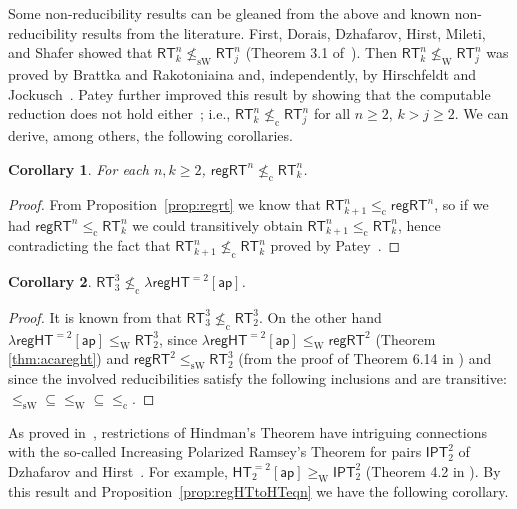 \documentclass[a4paper,11pt]{article}
\newtheorem{corollary}{Corollary}
\newcommand\HT{\mathsf{HT}}
\newcommand\IPT{\mathsf{IPT}}
\newcommand\RT{\mathsf{RT}}
\newcommand\regHT{\mathsf{regHT}}
\newcommand\REG{\mathsf{regRT}}
\newcommand\compred{\mathrm{c}}
\newcommand\W{\mathrm{W}}
\newcommand\sW{\mathrm{sW}}
\newcommand\ap{\mathsf{ap}}
\begin{document}
Some non-reducibility results can be gleaned from the above and known non-reducibility results from the literature. First, Dorais, Dzhafarov, Hirst, Mileti, and Shafer showed that $\RT^n_k \not\leq_{\sW} \RT^n_j$ (Theorem 3.1 of~\cite{DJSW:16}). Then $\RT^n_k \not\leq_{\W} \RT^n_j$ was proved by Brattka and Rakotoniaina \cite{Bra-Rat:17} and, independently, by Hirschfeldt and Jockusch~\cite{Hir-Joc:16}. Patey further improved this result by showing that the computable reduction does not hold either~\cite{Pat:16}; i.e., $\RT^n_k \not\leq_{\compred} \RT^n_j$ for all $n\geq 2$, $k > j \geq 2$. We can derive, among others, the following corollaries. 

\begin{corollary}\label{prop:reg-forallk-rt}
For each $n, k \geq 2$, $\REG^n \not\leq_{\compred} \RT^n_k$.
\end{corollary}

\begin{proof}
From Proposition~\ref{prop:regrt} we know that $\RT^n_{k+1} \leq_{\compred} \REG^n$, so if we had $\REG^n \leq_{\compred} \RT^n_k$ we could transitively obtain $\RT^n_{k+1} \leq_{\compred} \RT^n_k$, hence contradicting the fact that $\RT^n_{k+1} \not\leq_{\compred} \RT^n_k$ proved by Patey~\cite{Pat:16}.
\end{proof}

\begin{corollary}
$\RT^3_3\not\leq_{\compred}\lambda\regHT^{= 2}[\ap]$.
\end{corollary}

\begin{proof}
It is known from \cite{Pat:16} that $\RT^3_3 \not\leq_{\compred} \RT^3_2$. 
On the other hand $\lambda\regHT^{= 2}[\ap] \leq_{\mathrm{W}} \RT^3_2$, since
$\lambda\regHT^{= 2}[\ap] \leq_{\mathrm{W}} \REG^2$ (Theorem \ref{thm:acareght}) and 
$\REG^2 \leq_\sW  \RT^3_2$ (from the proof of Theorem 6.14 in \cite{Hir:phd}) and since the involved
reducibilities satisfy the following inclusions and are transitive: $\leq_\sW \subseteq \leq_\W \subseteq \leq_\compred$.
\end{proof}

As proved in~\cite{Car-Kol-Lep-Zda:20}, restrictions of Hindman's Theorem have intriguing connections
with the so-called 
Increasing Polarized Ramsey's Theorem for pairs $\IPT^2_2$ of Dzhafarov and Hirst~\cite{Dza-Hir:11}. For example, 
$\HT^{=2}_2[\ap] \geq_\W \IPT^2_2$ (Theorem 4.2 in \cite{Car-Kol-Lep-Zda:20}). By this result and Proposition~\ref{prop:regHTtoHTeqn} we have the following corollary.
\end{document}
